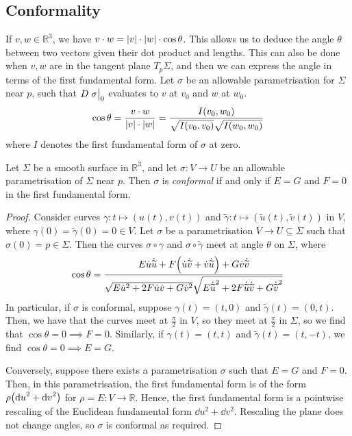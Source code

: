 \documentclass[a4paper,11pt]{article}
\begin{document}
\subsection{Conformality}
If \( v,w \in \mathbb R^3 \), we have \( v \cdot w = \abs{v} \cdot \abs{w} \cdot \cos\theta \).
This allows us to deduce the angle \( \theta \) between two vectors given their dot product and lengths.
This can also be done when \( v,w \) are in the tangent plane \( T_p \Sigma \), and then we can express the angle in terms of the first fundamental form.
Let \( \sigma \) be an allowable parametrisation for \( \Sigma \) near \( p \), such that \( D\eval{\sigma}_0 \) evaluates to \( v \) at \( v_0 \) and \( w \) at \( w_0 \).
\[
	\cos \theta = \frac{v \cdot w}{\abs{v} \cdot \abs{w}} = \frac{I(v_0, w_0)}{\sqrt{I(v_0,v_0)} \sqrt{I(w_0,w_0)}}
\]
where \( I \) denotes the first fundamental form of \( \sigma \) at zero.
\begin{lemma}
	Let \( \Sigma \) be a smooth surface in \( \mathbb R^3 \), and let \( \sigma \colon V \to U \) be an allowable parametrisation of \( \Sigma \) near \( p \).
	Then \( \sigma \) is \textit{conformal} if and only if \( E = G \) and \( F = 0 \) in the first fundamental form.
\end{lemma}
\begin{proof}
	Consider curves \( \gamma \colon t \mapsto (u(t), v(t)) \) and \( \widetilde \gamma \colon t \mapsto (\widetilde u(t), \widetilde v(t)) \) in \( V \), where \( \gamma(0) = \widetilde \gamma(0) = 0 \in V \).
	Let \( \sigma \) be a parametrisation \( V \to U \subseteq \Sigma \) such that \( \sigma(0) = p \in \Sigma \).
	Then the curves \( \sigma \circ \gamma \) and \( \sigma \circ \widetilde \gamma \) meet at angle \( \theta \) on \( \Sigma \), where
	\[
		\cos \theta = \frac{E \dot u \dot {\widetilde u} + F \qty(\dot u \dot{\widetilde v} + \dot v \dot{\widetilde u}) + G \dot v \dot{\widetilde v}}{\sqrt{E \dot u^2 + 2F \dot u \dot v + G \dot v^2} \sqrt{E \dot{\widetilde u}^2 + 2F \dot{\widetilde u} \dot {\widetilde v} + G \dot{\widetilde v}^2}}
	\]
	In particular, if \( \sigma \) is conformal, suppose \( \gamma(t) = (t,0) \) and \( \widetilde \gamma(t) = (0,t) \).
	Then, we have that the curves meet at \( \frac{\pi}{2} \) in \( V \), so they meet at \( \frac{\pi}{2} \) in \( \Sigma \), so we find that \( \cos \theta = 0 \implies F = 0 \).
	Similarly, if \( \gamma(t) = (t,t) \) and \( \widetilde \gamma(t) = (t,-t) \), we find \( \cos \theta = 0 \implies E = G \).

	Conversely, suppose there exists a parametrisation \( \sigma \) such that \( E = G \) and \( F = 0 \).
	Then, in this parametrisation, the first fundamental form is of the form \( \rho \qty(\dd{u}^2 + \dd{v}^2) \) for \( \rho = E \colon V \to \mathbb R \).
	Hence, the first fundamental form is a pointwise rescaling of the Euclidean fundamental form \( \dd{u}^2 + \dd{v}^2 \).
	Rescaling the plane does not change angles, so \( \sigma \) is conformal as required.
\end{proof}
\end{document}
